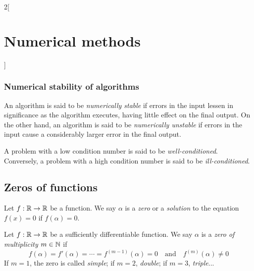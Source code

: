 \documentclass[../../../main.tex]{subfiles}
\begin{document}
\begin{multicols}{2}[\section{Numerical methods}]
  \subsubsection{Numerical stability of algorithms}
  \begin{definition}
    An algorithm is said to be \emph{numerically stable} if  errors in the input lessen in significance as the algorithm executes, having little effect on the final output. On the other hand, an algorithm is said to be \emph{numerically unstable} if errors in the input cause a considerably larger error in the final output.
  \end{definition}
  \begin{definition}
    A problem with a low condition number is said to be \emph{well-conditioned}. Conversely, a problem with a high condition number is said to be \emph{ill-conditioned}.
  \end{definition}
  \subsection{Zeros of functions}
  \begin{definition}
    Let $f:\mathbb{R}\rightarrow\mathbb{R}$ be a function. We say $\alpha$ is a \emph{zero} or a \emph{solution} to the equation $f(x)=0$ if $f(\alpha)=0$.
  \end{definition}
  \begin{definition}
    Let $f:\mathbb{R}\rightarrow\mathbb{R}$ be a sufficiently differentiable function. We say $\alpha$ is a \emph{zero of multiplicity $m\in\mathbb{N}$} if $$f(\alpha)=f'(\alpha)=\cdots=f^{(m-1)}(\alpha)=0\quad\text{and}\quad f^{(m)}(\alpha)\ne0$$ If $m=1$, the zero is called \emph{simple}; if $m=2$, \emph{double}; if $m=3$, \emph{triple}...
  \end{definition}

\end{multicols}
\end{document}
